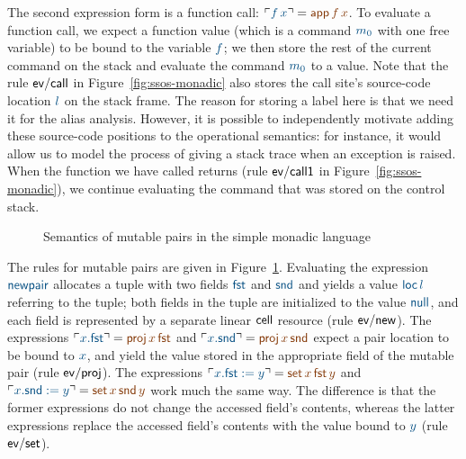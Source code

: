 The second expression form is a function call: $\interp{f\,x} = \lf{{\sf
  app}\,f\,x}$. To evaluate a function call, we expect a function value
(which is a command $\obj{m_0}$ with one free variable) to be bound to the
variable $\obj{f}$; we then store the rest of the current command on the
stack and evaluate the command $\obj{m_0}$ to a value. Note that the rule
${\sf ev/call}$ in Figure~\ref{fig:ssos-monadic} also stores the call
site's source-code location $\obj{l}$ on the stack frame. The reason for
storing a label here is that we need it for the alias
analysis. However, it is possible to independently motivate adding
these source-code positions to the operational semantics: for instance, it
would allow us to model the process of giving a stack trace when an
exception is raised. When the function we have called returns (rule
${\sf ev/call1}$ in Figure~\ref{fig:ssos-monadic}), we continue
evaluating the command that was stored on the control stack.

\begin{figure}
\caption{Semantics of mutable pairs in the simple monadic language}
\label{fig:ssos-monadic2}
\end{figure}

The rules for mutable pairs are given in
Figure~\ref{fig:ssos-monadic2}. Evaluating the expression $\obj{\sf
  newpair}$ allocates a tuple with two fields $\obj{\sf fst}$ and 
$\obj{\sf
  snd}$ and yields a value $\obj{{\sf loc}\,l}$ referring to the tuple; both
fields in the tuple are initialized to the value $\obj{\sf null}$, and
each field is represented by a separate linear ${\sf cell}$ resource
(rule ${\sf ev/new}$). The expressions $\interp{x.{\sf fst}} = \lf{{\sf
  proj}\,x\,{\sf fst}}$ and $\interp{x.{\sf snd}} = \lf{{\sf proj}\,x\,{\sf
  snd}}$ expect a pair location to be bound to $\obj{x}$, and yield the value
stored in the appropriate field of the mutable pair (rule ${\sf
  ev/proj}$). The expressions $\interp{x.{\sf fst} := y} = \lf{{\sf
  set}\,x\,{\sf fst}\,y}$ and $\interp{x.{\sf snd} := y} = \lf{{\sf
  set}\,x\,{\sf snd}\,y}$ work much the same way. The difference is
that the former expressions do not change the accessed field's
contents, whereas the latter expressions replace the accessed field's
contents with the value bound to $\obj{y}$ (rule ${\sf ev/set}$).

